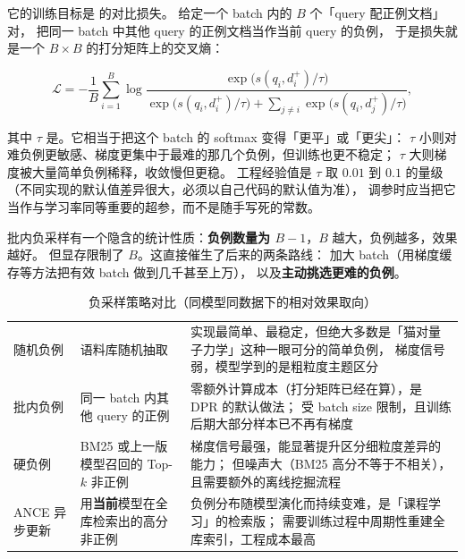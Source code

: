 它的训练目标是 的对比损失。
给定一个 batch 内的 $B$ 个「query 配正例文档」对，
把同一 batch 中其他 query 的正例文档当作当前 query 的负例，
于是损失就是一个 $B \times B$ 的打分矩阵上的交叉熵：

\begin{equation}
\mathcal{L} = -\frac{1}{B} \sum_{i=1}^{B}
\log \frac{\exp\big( s(q_i, d_i^{+}) / \tau \big)}
{\exp\big( s(q_i, d_i^{+}) / \tau \big) + \sum_{j \ne i} \exp\big( s(q_i, d_j^{+}) / \tau \big)} ,
\label{eq:inbatch-softmax}
\end{equation}

其中 $\tau$ 是。它相当于把这个 batch 的 softmax 变得「更平」或「更尖」：
$\tau$ 小则对难负例更敏感、梯度更集中于最难的那几个负例，但训练也更不稳定；
$\tau$ 大则梯度被大量简单负例稀释，收敛慢但更稳。
工程经验值是 $\tau$ 取 $0.01$ 到 $0.1$ 的量级（不同实现的默认值差异很大，必须以自己代码的默认值为准），
调参时应当把它当作与学习率同等重要的超参，而不是随手写死的常数。

批内负采样有一个隐含的统计性质：\textbf{负例数量为 $B-1$}，$B$ 越大，负例越多，效果越好。
但显存限制了 $B$。这直接催生了后来的两条路线：
加大 batch（用梯度缓存等方法把有效 batch 做到几千甚至上万），
以及\textbf{主动挑选更难的负例}。

\begin{table}[htbp]
\centering
\caption{负采样策略对比（同模型同数据下的相对效果取向）}
\label{tab:negatives}
\small
\begin{tabularx}{\textwidth}{L{2.5cm} L{2.6cm} Y}
\toprule
{} &  &  \\
\midrule
随机负例 & 语料库随机抽取 &
实现最简单、最稳定，但绝大多数是「猫对量子力学」这种一眼可分的简单负例，
梯度信号弱，模型学到的是粗粒度主题区分 \\
\addlinespace
批内负例 & 同一 batch 内其他 query 的正例 &
零额外计算成本（打分矩阵已经在算），是 DPR 的默认做法；
受 batch size 限制，且训练后期大部分样本已不再有梯度 \\
\addlinespace
硬负例 & BM25 或上一版模型召回的 Top-$k$ 非正例 &
梯度信号最强，能显著提升区分细粒度差异的能力；
但噪声大（BM25 高分不等于不相关），且需要额外的离线挖掘流程 \\
\addlinespace
ANCE 异步更新 & 用\textbf{当前}模型在全库检索出的高分非正例 &
负例分布随模型演化而持续变难，是「课程学习」的检索版；
需要训练过程中周期性重建全库索引，工程成本最高 \\
\bottomrule
\end{tabularx}
\end{table}

